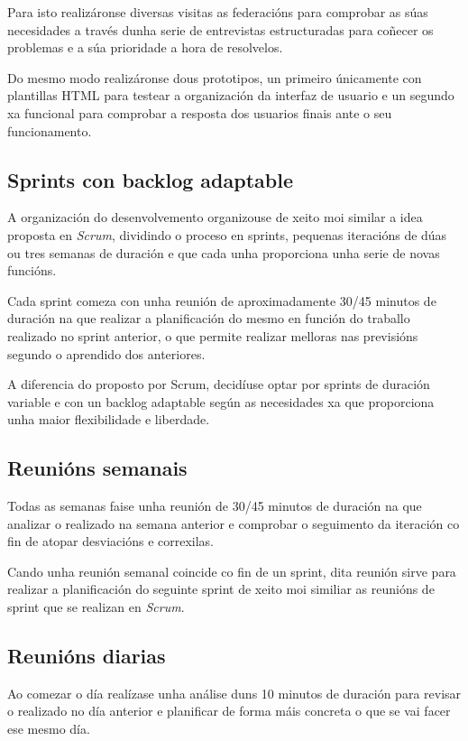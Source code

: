     Para isto realizáronse diversas visitas as federacións para comprobar as 
súas necesidades a través dunha serie de entrevistas estructuradas para 
coñecer os problemas e a súa prioridade a hora de resolvelos.

    Do mesmo modo realizáronse dous prototipos, un primeiro únicamente 
con plantillas HTML para testear a organización da interfaz de usuario e un 
segundo xa funcional para comprobar a resposta dos usuarios finais ante o seu 
funcionamento.

    \subsection{Sprints con backlog adaptable}
    A organización do desenvolvemento organizouse de xeito moi similar a idea 
proposta en \emph{Scrum}, dividindo o proceso en sprints, pequenas iteracións 
de dúas ou tres semanas de duración e que cada unha proporciona unha serie de 
novas funcións.

    Cada sprint comeza con unha reunión de aproximadamente 30/45 minutos de 
duración na que realizar a planificación do mesmo en función do 
traballo realizado no sprint anterior, o que permite realizar melloras nas 
previsións segundo o aprendido dos anteriores.

    A diferencia do proposto por Scrum, decidíuse optar por sprints de duración 
variable e con un backlog adaptable según as necesidades xa que proporciona 
unha maior flexibilidade e liberdade.

    \subsection{Reunións semanais}
    Todas as semanas faise unha reunión de 30/45 minutos de duración na que 
analizar o realizado na semana anterior e comprobar o seguimento da iteración 
co fin de atopar desviacións e correxilas.

    Cando unha reunión semanal coincide co fin de un sprint, dita reunión 
sirve para realizar a planificación do seguinte sprint de xeito moi similiar as 
reunións de sprint que se realizan en \emph{Scrum}.

    \subsection{Reunións diarias}
    Ao comezar o día realízase unha análise duns 10 minutos de duración para 
revisar o realizado no día anterior e planificar de forma máis concreta o que 
se vai facer ese mesmo día.

